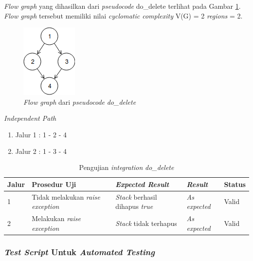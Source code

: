 \par\null\par
\noindent
\emph{Flow graph} yang dihasilkan dari \emph{pseudocode}
do\_delete terlihat pada Gambar \ref{cfg:rm_stack}.
\emph{Flow graph} tersebut memiliki nilai \emph{cyclomatic complexity} V(G) = 2 \emph{regions} = 2.

\begin{figure}[H]
  \centering
  \includegraphics[width=.14\linewidth]{img/test-case/4node}
  \caption{\emph{Flow graph} dari \emph{pseudocode} \emph{do\_delete}}
  \label{cfg:rm_stack}
\end{figure}

\noindent
\emph{Independent Path}

\begin{enumerate}
\item Jalur 1 : 1 - 2 - 4
\item Jalur 2 : 1 - 3 - 4
\end{enumerate}

\newpage

\begin{longtable}{|P{.06\textwidth}|P{.30\textwidth}|P{.30\textwidth}|P{.10\textwidth}|P{.08\textwidth}|}
  \caption{Pengujian \emph{integration} \emph{do\_delete}} \label{jalur:rm-stack}\\
  \hline
  \textbf{Jalur} & \textbf{Prosedur Uji} & \textbf{\emph{Expected Result}}
  & \textbf{\emph{Result}} & \textbf{Status} \\\hline
  1 & Tidak melakukan  \emph{raise exception} & \emph{Stack} berhasil dihapus
                                          \emph{true} & \emph{As expected} & Valid \\\hline
  2 & Melakukan  \emph{raise exception} & \emph{Stack} tidak terhapus & \emph{As expected} & Valid \\\hline
\end{longtable}

\subsubsection{\emph{Test Script} Untuk \emph{Automated Testing}}

